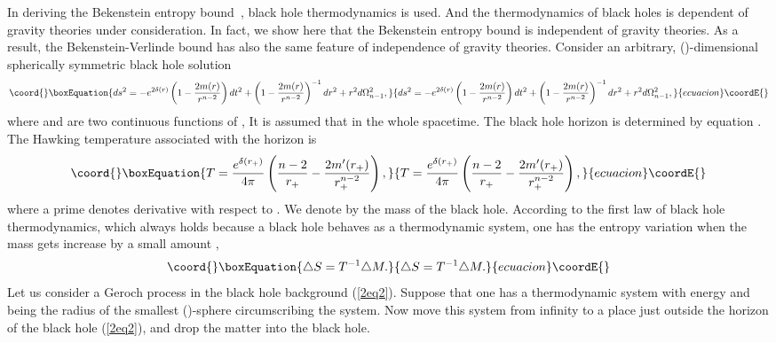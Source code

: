 \documentclass[a4paper,12pt]{article}
\begin{document}
In deriving the Bekenstein entropy bound~\cite{Beke,Bousso}, black hole thermodynamics is used.
And  the thermodynamics of black holes  is dependent of gravity
theories under consideration.  In fact, we show here that the Bekenstein entropy
bound is independent of gravity theories. As a result, the Bekenstein-Verlinde bound has also
the same feature of independence of gravity theories.  Consider an
arbitrary, (\coordHE{})-dimensional spherically symmetric black hole solution
\begin{equation}\coord{}\boxEquation{
\label{2eq2}
ds^2 =- e^{2\delta (r)}\left (1-\frac{2m(r)}{r^{n-2}}\right) dt^2
       +\left( 1-\frac{2 m(r)}{r^{n-2}}\right)^{-1}dr^2 +r^2d\Omega_{n-1}^2,
}{
ds^2 =- e^{2\delta (r)}\left (1-\frac{2m(r)}{r^{n-2}}\right) dt^2
       +\left( 1-\frac{2 m(r)}{r^{n-2}}\right)^{-1}dr^2 +r^2d\Omega_{n-1}^2,
}{ecuacion}\coordE{}\end{equation}
where \myHighlight{$\delta $}\coordHE{} and \coordHE{} are two continuous functions of \coordHE{}, It is assumed that
\coordHE{} in the whole spacetime. The black hole
horizon \coordHE{} is determined by equation \coordHE{}. The Hawking
temperature \coordHE{} associated with the horizon is
\begin{equation}\coord{}\boxEquation{
\label{2eq3}
T=\frac{e^{\delta(r_+)}}{4\pi}\left(\frac{n-2}{r_+}-
  \frac{2m'(r_+)}{r_+^{n-2}}\right),
}{
T=\frac{e^{\delta(r_+)}}{4\pi}\left(\frac{n-2}{r_+}-
  \frac{2m'(r_+)}{r_+^{n-2}}\right),
}{ecuacion}\coordE{}\end{equation}
where a prime denotes derivative with respect to \coordHE{}.  We denote by \coordHE{}  the mass of
 the black hole. According to the first law of black hole thermodynamics, which always
 holds because a black hole behaves as a thermodynamic system, one
has the entropy variation \coordHE{} when the mass gets increase by a small
 amount \coordHE{},
\begin{equation}\coord{}\boxEquation{
\label{2eq4}
\triangle S = T^{-1}\triangle M.
}{
\triangle S = T^{-1}\triangle M.
}{ecuacion}\coordE{}\end{equation}
Let us consider a Geroch process in the black hole background (\ref{2eq2}).
Suppose that one has a thermodynamic system with energy \coordHE{} and \coordHE{} being the radius
of the smallest (\coordHE{})-sphere circumscribing the system. Now move this system from
infinity to a place just outside the horizon of the black hole (\ref{2eq2}), and drop
the matter into the black hole.
\end{document}
